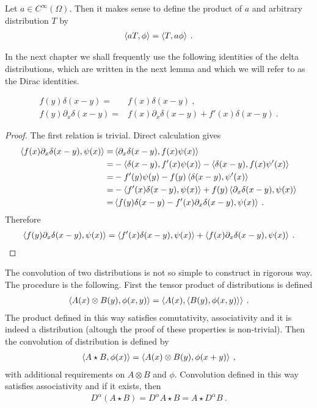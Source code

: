 

Let $a \in C^\infty(\Omega)$. Then it makes sense to define the product of $a$ and arbitrary distribution $T$ by
\begin{align}
    \left \langle a T ,\phi \right \rangle = \left \langle T ,a \phi \right \rangle \:.
\end{align}

In the next chapter we shall frequently use the following identities of the delta distributions, which are written in the next lemma and which we will refer to as the Dirac identities.

\begin{lemma} \label{lemma:delta}
    \begin{align}
        f(y) \delta (x-y) =& f(x) \delta(x-y) \:, \\
        f(y) \partial_x \delta(x-y) =& f(x) \partial_x \delta(x-y) + f'(x) \delta(x-y) \:.
    \end{align}
\end{lemma}
\begin{proof}
    The first relation is trivial.
    Direct calculation gives
    \begin{align*}
        \left \langle f(x) \partial_x \delta(x-y) ,\psi(x) \right \rangle 
        =& \left \langle \partial_x \delta(x-y) ,f(x) \psi(x) \right \rangle 
         \\ =& -\left \langle \delta(x-y) ,f'(x)\psi(x) \right \rangle - \left \langle \delta(x-y) ,f(x)\psi'(x) \right \rangle 
         \\ =& -f'(y) \psi(y) - f(y) \left \langle \delta(x-y) ,\psi'(x) \right \rangle 
         \\ =& - \left \langle f'(x)  \delta(x-y) ,\psi(x) \right \rangle + f(y) \left \langle \partial_x \delta(x-y) ,\psi(x) \right \rangle 
         \\ =& \left \langle f(y) \delta(x-y) - f'(x) \partial_x \delta(x-y) ,\psi(x) \right \rangle \:.
    \end{align*}
    Therefore
    \begin{align}
        \left \langle f(y) \partial_x \delta(x-y) ,\psi(x) \right \rangle = \left \langle f'(x) \delta(x-y) ,\psi(x) \right \rangle + \left \langle f(x) \partial_x \delta(x-y) ,\psi(x) \right \rangle \:.
    \end{align} 
\end{proof}

The convolution of two distributions is not so simple to construct in rigorous way. The procedure is the following. First the tensor product of distributions is defined
\begin{align}
    \left \langle A(x) \otimes B(y) ,\phi(x,y) \right \rangle = \left \langle A(x) ,\left \langle B(y) ,\phi(x,y) \right \rangle \right \rangle \:.
\end{align}
The product defined in this way satisfies comutativity, associativity and it is indeed a distribution (altough the proof of these properties is non-trivial). Then the convolution of distribution is defined by
\begin{align}
    \left \langle A \star B ,\phi(x) \right \rangle = \left \langle A(x) \otimes B(y) ,\phi(x+y) \right \rangle \:,
\end{align}
with additional requirements on $A \otimes B$ and $\phi$. Convolution defined in this way satisfies associativity and if it exists, then
\begin{align}
    D^\alpha (A \star B) = D^\alpha A \star B = A \star D^\alpha B \:.
\end{align}


